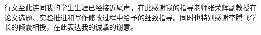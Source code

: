 
\begin{acknowledgements}

   行文至此连同我的学生生涯已经接近尾声，在此感谢我的指导老师张荣辉副教授在论文选题、实验推进和写作修改过程中给予的细致指导。同时也特别感谢李腾飞学长的倾囊相授，在此表达我的诚挚的谢意。

\end{acknowledgements}
